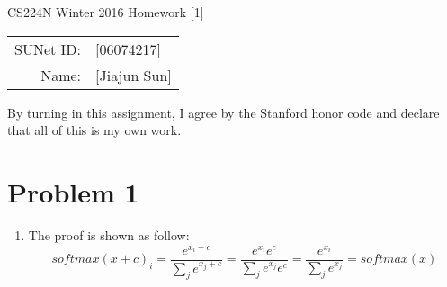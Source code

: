 \documentclass[10pt]{article}
\begin{document}
\begin{center}
{\Large CS224N Winter 2016 Homework [1]}

\begin{tabular}{rl}
SUNet ID: & [06074217] \\
Name: & [Jiajun Sun] \\
\end{tabular}
\end{center}

By turning in this assignment, I agree by the Stanford honor code and declare
that all of this is my own work.

\section*{Problem 1}
\begin{enumerate}[label=(\alph*)]
\item
The proof is shown as follow:
    \begin{equation*}
    	softmax(x+c)_i=\frac{e^{x_i+c}}{\sum_j e^{x_j+c}}=\frac{e^{x_i}e^c}{\sum_j e^{x_j}e^c}=\frac{e^{x_i}}{\sum_j e^{x_j}}=softmax(x)
    \end{equation*}

\end{enumerate}
\end{document}
